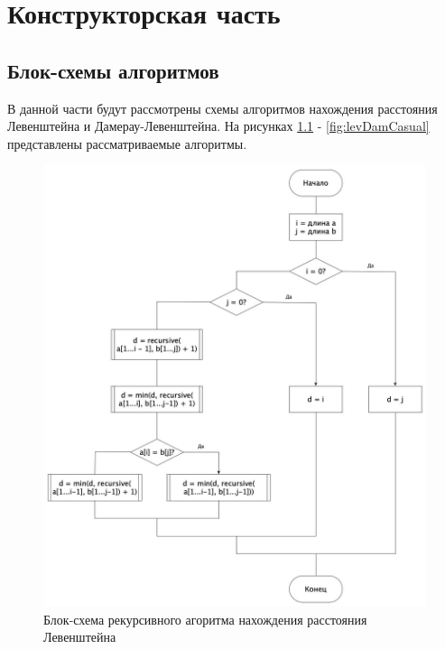 \documentclass[12pt]{report}
\begin{document}
    \chapter{Конструкторская часть}


    \section{Блок-схемы алгоритмов}
    В данной части будут рассмотрены схемы алгоритмов нахождения расстояния Левенштейна и Дамерау-Левенштейна.
    На рисунках \ref{fig:levRecur} - \ref{fig:levDamCasual} представлены рассматриваемые алгоритмы.

    \begin{figure}[H]
        \centering
        \includegraphics[width=0.7\linewidth]{img/levRecur}
        \caption{Блок-схема рекурсивного агоритма нахождения расстояния Левенштейна}
        \label{fig:levRecur}
    \end{figure}
\end{document}
